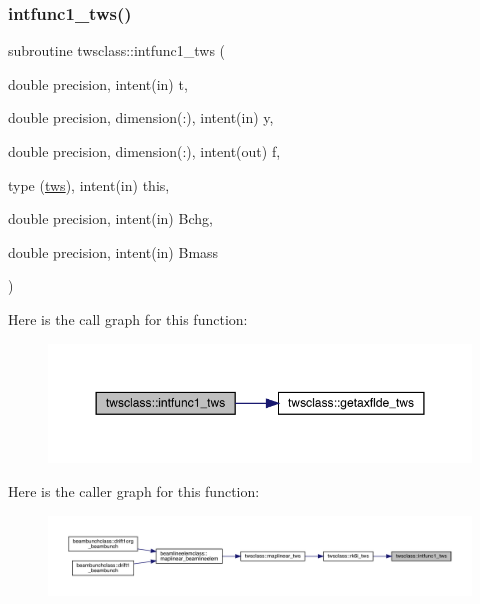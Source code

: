 \subsubsection{\texorpdfstring{intfunc1\_tws()}{intfunc1\_tws()}}
{\footnotesize\ttfamily subroutine twsclass\+::intfunc1\+\_\+tws (\begin{DoxyParamCaption}\item[{double precision, intent(in)}]{t,  }\item[{double precision, dimension(\+:), intent(in)}]{y,  }\item[{double precision, dimension(\+:), intent(out)}]{f,  }\item[{type (\mbox{\hyperlink{namespacetwsclass_structtwsclass_1_1tws}{tws}}), intent(in)}]{this,  }\item[{double precision, intent(in)}]{Bchg,  }\item[{double precision, intent(in)}]{Bmass }\end{DoxyParamCaption})}

Here is the call graph for this function\+:\nopagebreak
\begin{figure}[H]
\begin{center}
\leavevmode
\includegraphics[width=350pt]{namespacetwsclass_a1681f57f6e70160ddb0f6e59f4cd5349_cgraph}
\end{center}
\end{figure}
Here is the caller graph for this function\+:\nopagebreak
\begin{figure}[H]
\begin{center}
\leavevmode
\includegraphics[width=350pt]{namespacetwsclass_a1681f57f6e70160ddb0f6e59f4cd5349_icgraph}
\end{center}
\end{figure}
\mbox{\label{namespacetwsclass_ab57cbdca9514adc28eb62c6bbb8633b6}} 
